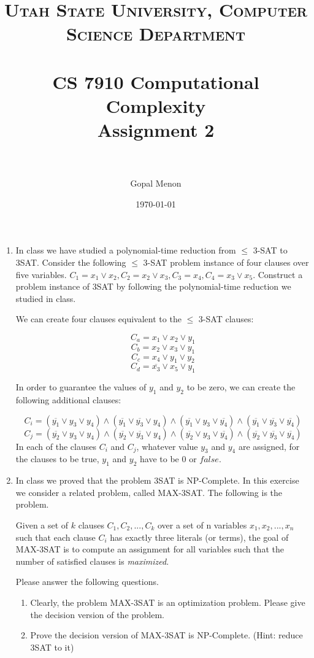 \documentclass[paper=a4, fontsize=11pt]{scrartcl} %
\title{	
\normalfont \normalsize 
\textsc{Utah State University, Computer Science Department} \\ [25pt] %
\horrule{0.5pt} \\[0.4cm] %
\huge CS 7910 Computational Complexity\\Assignment 2 \\ %
\horrule{2pt} \\[0.5cm] %
}
\author{Gopal Menon} %
\date{\normalsize\today} %
\numberwithin{equation}{section} %
\numberwithin{figure}{section} %
\numberwithin{table}{section} %
\begin{document}
\maketitle %

\begin{enumerate}
\item In class we have studied a polynomial-time reduction from $\leq$ 3-SAT to 3SAT.
Consider the following $\leq$ 3-SAT problem instance of four clauses over five variables. $C_1 =
x_1 \lor x_2, C_2 = x_2 \lor x_3, C_3 = x_4, C_4 = x_3 \lor x_5$. Construct a problem instance of 3SAT by
following the polynomial-time reduction we studied in class.

We can create four clauses equivalent to the $\leq$ 3-SAT clauses:

$$
C_a = x_1 \lor x_2 \lor y_1
$$
$$
C_b = x_2 \lor x_3 \lor y_1
$$
$$
C_c = x_4 \lor y_1 \lor y_2
$$
$$
C_d = \overline{x_3} \lor x_5 \lor y_1
$$

In order to guarantee the values of $y_1$ and $y_2$ to be zero, we can create the following additional clauses:

$$
C_i = (\overline{y_1} \lor y_3 \lor y_4) \land (\overline{y_1} \lor \overline{y_3} \lor y_4) \land (\overline{y_1} \lor y_3 \lor \overline{y_4}) \land (\overline{y_1} \lor \overline{y_3} \lor \overline{y_4})
$$
$$
C_j = (\overline{y_2} \lor y_3 \lor y_4) \land (\overline{y_2} \lor \overline{y_3} \lor y_4) \land (\overline{y_2} \lor y_3 \lor \overline{y_4}) \land (\overline{y_2} \lor \overline{y_3} \lor \overline{y_4})
$$
In each of the clauses $C_i$ and $C_j$, whatever value $y_3$ and $y_4$ are assigned, for the clauses to be true, $y_1$ and $y_2$ have to be $0$ or $false$.

\item In class we proved that the problem 3SAT is NP-Complete. In this exercise we
consider a related problem, called MAX-3SAT. The following is the problem.

Given a set of $k$ clauses $C_1, C_2, . . . , C_k$ over a set of n variables $x_1, x_2, . . . , x_n$ such that each clause $C_i$ has exactly three literals (or terms), the goal of MAX-3SAT is to compute an assignment for all variables such that the number of satisfied clauses is \textit{maximized}.

Please answer the following questions.
\begin{enumerate}

\item Clearly, the problem MAX-3SAT is an optimization problem. Please give the decision
version of the problem.

\item Prove the decision version of MAX-3SAT is NP-Complete. (Hint: reduce 3SAT to it)

\end{enumerate}

\end{enumerate}

\end{document}

